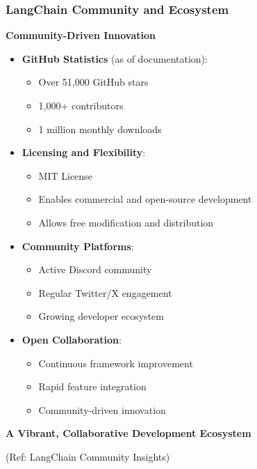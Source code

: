 \begin{frame}\frametitle{LangChain Community and Ecosystem}

\textbf{Community-Driven Innovation}

\begin{itemize}
\item \textbf{GitHub Statistics} (as of documentation):
    \begin{itemize}
        \item Over 51,000 GitHub stars
        \item 1,000+ contributors
        \item 1 million monthly downloads
    \end{itemize}

\item \textbf{Licensing and Flexibility}:
    \begin{itemize}
        \item MIT License
        \item Enables commercial and open-source development
        \item Allows free modification and distribution
    \end{itemize}

\item \textbf{Community Platforms}:
    \begin{itemize}
        \item Active Discord community
        \item Regular Twitter/X engagement
        \item Growing developer ecosystem
    \end{itemize}

\item \textbf{Open Collaboration}:
    \begin{itemize}
        \item Continuous framework improvement
        \item Rapid feature integration
        \item Community-driven innovation
    \end{itemize}
\end{itemize}

\begin{center}
\textbf{A Vibrant, Collaborative Development Ecosystem}
\end{center}

{\tiny (Ref: LangChain Community Insights)}
\end{frame}


